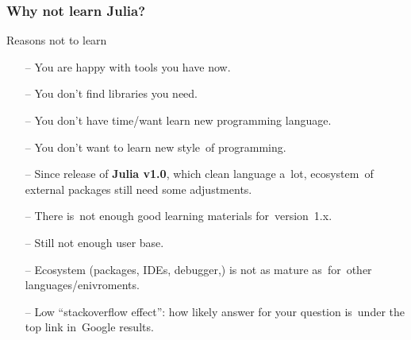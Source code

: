 \documentclass{beamer}  %
\begin{document}
\begin{frame}
  \frametitle{Why not learn Julia?}

  \begin{block}{Reasons not to learn}
    \begin{itemize}
    \item[--] You are happy with tools you have now.
    \item[--] You don't find libraries you need.
    \item[--] You don't have time/want learn new programming language.
    \item[--] You don't want to learn new style~of programming.
    \item[--] Since release of \textbf{Julia v1.0}, which clean
      language a~lot, ecosystem~of external packages still need some
      adjustments.
    \item[--] There is~not enough good learning materials
      for~version~1.x.
    \item[--] Still not enough user base.
    \item[--] Ecosystem (packages, IDEs, debugger,\ld) is not as
      mature as~for~other languages/enivroments.
    \item[--] Low ``stackoverflow effect'': how likely answer for your
      question is~under the top link in~Google results.
    \end{itemize}
  \end{block}
  
\end{frame}
\end{document}

